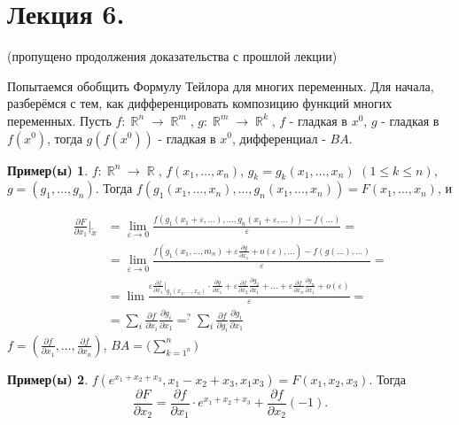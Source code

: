 \documentclass[a4paper,100pt]{article}
\theoremstyle{indented}
\theoremstyle{definition}
\newtheorem{exl}{Пример(ы)}
\theoremstyle{remark}
\DeclareMathOperator{\RR}{\mathbb{R}}
\begin{document}
\section{Лекция 6.}

(пропущено продолжения доказательства с прошлой лекции)\ 

Попытаемся обобщить Формулу Тейлора для многих переменных. Для начала, разберёмся с тем, как дифференцировать композицию функций многих переменных. Пусть $f:\RR^n\rightarrow \RR^m$, $g:\RR^m\rightarrow \RR^k$, $f$ - гладкая в $x^0$, $g$ - гладкая в $f(x^0)$, тогда $g(f(x^0))$ - гладкая в $x^0$, дифференциал - $BA$. 

\begin{exl}
    $f:\RR^n\rightarrow \RR$, $f(x_1, \ldots, x_n)$, $g_k= g_k(x_1, \ldots, x_n)$ $(1\leq k\leq n)$, $g=(g_1, \ldots, g_n)$. Тогда $f(g_1(x_1, \ldots, x_n), \ldots, g_n(x_1, \ldots, x_n))=F(x_1, \ldots, x_n)$, и 
    
\begin{equation*}
    \begin{aligned}
            \frac{\partial F}{\partial x_1}\bigg|_{\tilde{x}} & = \lim_{\varepsilon \rightarrow 0}\frac{f(g_1(x_1+\varepsilon, \ldots), \ldots, g_n(x_1+\varepsilon, \ldots))- f(\ldots)}{\varepsilon} = \\
            & = \lim_{\varepsilon\rightarrow 0}\frac{f(g_1(x_1, \ldots, m_n)+\varepsilon\frac{\partial g}{\partial x_1}+o(\varepsilon), \ldots)-f(g(\ldots), \ldots)}{\varepsilon} = \\ 
            & = \lim\frac{\varepsilon\frac{\partial f}{\partial x_1}\bigg|_{g_1(x_1, \ldots, x_n)}\cdot\frac{\partial g}{\partial x_1}+\varepsilon\frac{\partial f}{\partial x_2}\frac{\partial g_2}{\partial x_1}+\ldots+\varepsilon\frac{\partial f}{\partial x_n}\frac{\partial g_n}{\partial x_1}+o(\varepsilon)}{\varepsilon} = \\ 
            & = \sum_i \frac{\partial f}{\partial x_i}\frac{\partial g_i}{\partial x_1} =^? \sum_i \frac{\partial f}{\partial g_i}\frac{\partial g_i}{\partial x_1}
    \end{aligned}
\end{equation*}
    $f=(\frac{\partial f}{\partial x_1}, \ldots, \frac{\partial f}{\partial x_n})$, $BA=\biggl(\sum_{k=1^n}^n\biggr)$
\end{exl}

\begin{exl}
    $f(e^{x_1+x_2+x_3}, x_1-x_2+x_3, x_1x_3) = F(x_1, x_2, x_3)$. Тогда 
    \[
        \frac{\partial F}{\partial x_2}= \frac{\partial f}{\partial x_1}\cdot e^{x_1+x_2+x_3}+\frac{\partial f}{\partial x_2}(-1). 
    \]
\end{exl}
\end{document}
